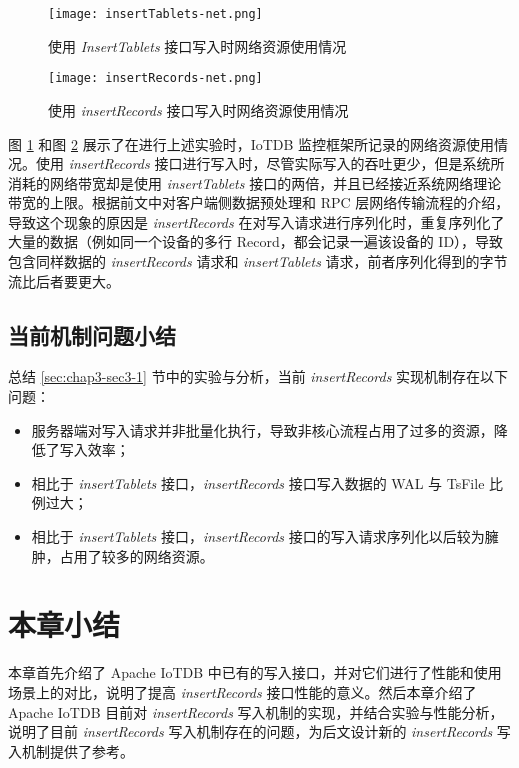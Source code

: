 \begin{figure}
  \centering
  \texttt{[image: insertTablets-net.png]}
  \caption{使用 \emph{InsertTablets} 接口写入时网络资源使用情况}
  \label{fig:curr-insert-tablets-net}
\end{figure}

\begin{figure}
  \centering
  \texttt{[image: insertRecords-net.png]}
  \caption{使用 \emph{insertRecords} 接口写入时网络资源使用情况}
  \label{fig:curr-insert-records-net}
\end{figure}



图 \ref{fig:curr-insert-tablets-net} 和图 \ref{fig:curr-insert-records-net} 展示了在进行上述实验时，IoTDB 监控框架所记录的网络资源使用情况。使用 \emph{insertRecords} 接口进行写入时，尽管实际写入的吞吐更少，但是系统所消耗的网络带宽却是使用 \emph{insertTablets} 接口的两倍，并且已经接近系统网络理论带宽的上限。根据前文中对客户端侧数据预处理和 RPC 层网络传输流程的介绍，导致这个现象的原因是 \emph{insertRecords} 在对写入请求进行序列化时，重复序列化了大量的数据（例如同一个设备的多行 Record，都会记录一遍该设备的 ID），导致包含同样数据的 \emph{insertRecords} 请求和 \emph{insertTablets} 请求，前者序列化得到的字节流比后者要更大。

\subsection{当前机制问题小结}
总结 \ref{sec:chap3-sec3-1} 节中的实验与分析，当前 \emph{insertRecords} 实现机制存在以下问题：
\begin{itemize}
  \item 服务器端对写入请求并非批量化执行，导致非核心流程占用了过多的资源，降低了写入效率；
  \item 相比于 \emph{insertTablets} 接口，\emph{insertRecords} 接口写入数据的 WAL 与 TsFile 比例过大；
  \item 相比于 \emph{insertTablets} 接口，\emph{insertRecords} 接口的写入请求序列化以后较为臃肿，占用了较多的网络资源。
\end{itemize}

\section{本章小结}
本章首先介绍了 Apache IoTDB 中已有的写入接口，并对它们进行了性能和使用场景上的对比，说明了提高 \emph{insertRecords} 接口性能的意义。然后本章介绍了 Apache IoTDB 目前对 \emph{insertRecords} 写入机制的实现，并结合实验与性能分析，说明了目前 \emph{insertRecords} 写入机制存在的问题，为后文设计新的 \emph{insertRecords} 写入机制提供了参考。
